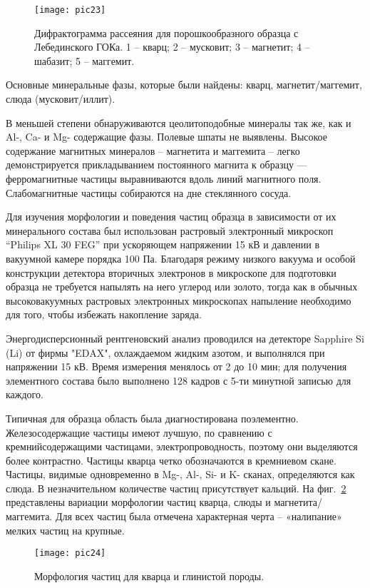 \begin{figure} [h] 
  \center
  \texttt{[image: pic23]}
  \caption{Дифрактограмма рассеяния для порошкообразного образца с Лебединского ГОКа. 1 – кварц; 2 – мусковит; 3 – магнетит; 4 – шабазит; 5 – маггемит.} 
  \label{img:2difra}  
\end{figure}

Основные минеральные фазы, которые были найдены: кварц, магнетит/маггемит, слюда (мусковит/иллит).

В меньшей степени обнаруживаются цеолитоподобные минералы так же, как и Al-, Ca- и Mg- содержащие фазы. Полевые шпаты не выявлены.
Высокое содержание магнитных минералов – магнетита и маггемита – легко демонстрируется прикладыванием постоянного магнита к образцу — ферромагнитные частицы выравниваются вдоль линий магнитного поля. Слабомагнитные частицы собираются на дне стеклянного сосуда.

Для изучения морфологии и поведения частиц образца в зависимости от их минерального состава был использован растровый электронный микроскоп “Philips XL 30 FEG” при ускоряющем напряжении 15 кВ и давлении в вакуумной камере порядка 100 Па. Благодаря режиму низкого вакуума и особой конструкции детектора вторичных электронов в микроскопе для подготовки образца не требуется напылять на него углерод или золото, тогда как в обычных высоковакуумных растровых электронных микроскопах напыление необходимо для того, чтобы избежать накопление заряда. 

Энергодисперсионный рентгеновский анализ проводился на детекторе Sapphire Si (Li) от фирмы "EDAX", охлаждаемом жидким азотом, и выполнялся при напряжении 15 кВ. Время измерения менялось от 2 до 10 мин; для получения элементного состава было выполнено 128 кадров с 5-ти минутной записью для каждого.

Типичная для образца область была диагностирована поэлементно. Железосодержащие частицы имеют лучшую, по сравнению с кремнийсодержащими частицами, электропроводность, поэтому они выделяются более контрастно. Частицы кварца четко обозначаются в кремниевом скане. Частицы, видимые одновременно в Mg-, Al-, Si- и K- сканах, определяются как слюда. В незначительном количестве частиц присутствует кальций. На фиг.~\ref{img:2morfo} представлены вариации морфологии частиц кварца, слюды и магнетита/маггемита. Для всех частиц была отмечена характерная черта – «налипание» мелких частиц на крупные.

\begin{figure} [H] 
  \center
  \texttt{[image: pic24]}
  \caption{Морфология частиц для кварца и глинистой породы.} 
  \label{img:2morfo}  
\end{figure}

